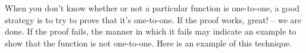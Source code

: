 
 

When you don't know whether or not a particular function is one-to-one, a good strategy is to try to prove that it's one-to-one.  If the proof works, great! -- we are done.  If the proof fails, the manner in which it fails may indicate an example to show that the function is not one-to-one.  Here is an example of this technique.

